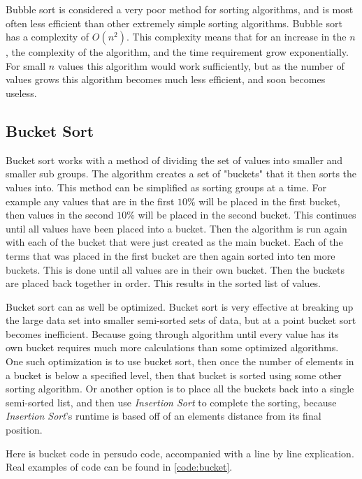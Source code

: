\documentclass{article}
\begin{document}
\begin{multicols}{2}
Bubble sort is considered a very poor method for sorting algorithms, and is most often less efficient than other extremely simple sorting algorithms. Bubble sort has a complexity of $O(n^2)$. This complexity means that for an increase in the $n$, the complexity of the algorithm, and the time requirement grow exponentially. For small $n$ values this algorithm would work sufficiently, but as the number of values grows this algorithm becomes much less efficient, and soon becomes useless.
\end{multicols}


\subsection{Bucket Sort}
\begin{multicols}{2}
Bucket sort works with a method of dividing the set of values into smaller and smaller sub groups. The algorithm creates a set of "buckets" that it then sorts the values into. This method can be simplified as sorting groups at a time. For example any values that are in the first $10\%$ will be placed in the first bucket, then values in the second $10\%$ will be placed in the second bucket. This continues until all values have been placed into a bucket. Then the algorithm is run again with each of the bucket that were just created as the main bucket. Each of the terms that was placed in the first bucket are then again sorted into ten more buckets. This is done until all values are in their own bucket. Then the buckets are placed back together in order. This results in the sorted list of values.

Bucket sort can as well be optimized. Bucket sort is very effective at breaking up the large data set into smaller semi-sorted sets of data, but at a point bucket sort becomes inefficient. Because going through algorithm until every value has its own bucket requires much more calculations than some optimized algorithms. One such optimization is to use bucket sort, then once the number of elements in a bucket is below a specified level, then that bucket is sorted using some other sorting algorithm. Or another option is to place all the buckets back into a single semi-sorted list, and then use \textit{Insertion Sort} to complete the sorting, because \textit{Insertion Sort}'s runtime is based off of an elements distance from its final position.

Here is bucket code in persudo code, accompanied with a line by line explication. Real examples of code can be found in \ref{code:bucket}.
\end{multicols}
\end{document}
